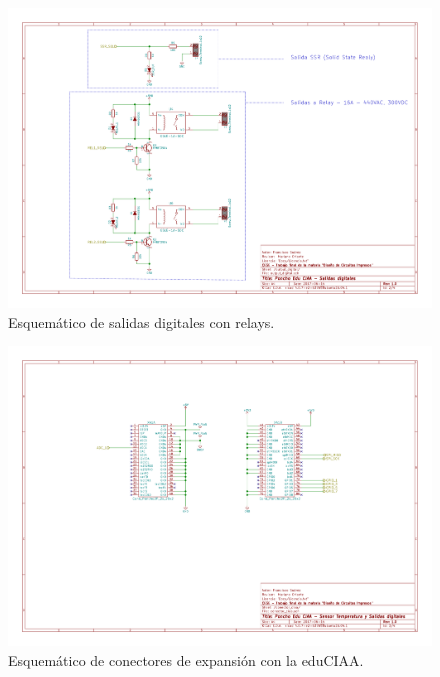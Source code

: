 \begin{figure}[h!]
	\centering
	\includegraphics[width=1\textwidth]{Figures/sch_outAnalogDigital}
	\caption{Esquemático de salidas digitales con relays.}
	\label{fig:schSalidas}
\end{figure}

\begin{figure}[h!]
	\centering
	\includegraphics[width=1\textwidth]{Figures/sch_conect_ciaa}
	\caption{Esquemático de conectores de expansión con la eduCIAA.}
	\label{fig:schSalidas}
\end{figure}


